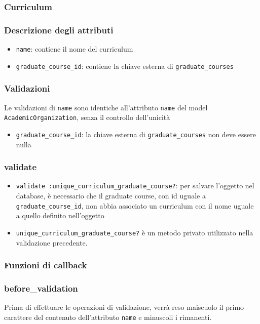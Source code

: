 \documentclass[11pt,a4paper]{article}
\begin{document}
\subsubsection{Curriculum}
\subsubsection*{Descrizione degli attributi}
\begin{itemize}
 \item \verb|name|: contiene il nome del curriculum
 \item \verb|graduate_course_id|: contiene la chiave esterna di \verb|graduate_courses|	 
\end{itemize}
\subsubsection*{Validazioni}
Le validazioni di \verb|name| sono identiche all'attributo \verb|name| del model \\ \verb|AcademicOrganization|, senza il controllo dell'unicità
\begin{itemize}
 \item \verb|graduate_course_id|: la chiave esterna di \verb|graduate_courses| non deve essere nulla
\end{itemize}
\subsubsection*{validate}
\begin{itemize}
 \item \verb|validate :unique_curriculum_graduate_course?|: per salvare l'oggetto nel database, è necessario che il graduate course, con id uguale a \verb|graduate_course_id|, non abbia associato un curriculum con il nome uguale a quello definito nell'oggetto
\item \verb|unique_curriculum_graduate_course?| è un metodo privato utilizzato nella validazione precedente.
\end{itemize}
\subsubsection*{Funzioni di callback}
\subsubsection*{before\_validation}
Prima di effettuare le operazioni di validazione, verrà reso maiscuolo il primo carattere del contenuto dell'attributo \verb|name| e minuscoli i rimanenti.
\end{document}
